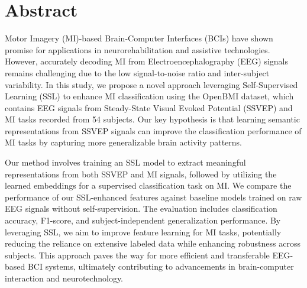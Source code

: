 \chapter*{Abstract}
\label{chap:abstract}


Motor Imagery (MI)-based Brain-Computer Interfaces (BCIs) have shown promise for applications in neurorehabilitation and assistive technologies. However, accurately decoding MI from Electroencephalography (EEG) signals remains challenging due to the low signal-to-noise ratio and inter-subject variability. In this study, we propose a novel approach leveraging Self-Supervised Learning (SSL) to enhance MI classification using the OpenBMI dataset, which contains EEG signals from Steady-State Visual Evoked Potential (SSVEP) and MI tasks recorded from 54 subjects. Our key hypothesis is that learning semantic representations from SSVEP signals can improve the classification performance of MI tasks by capturing more generalizable brain activity patterns.


Our method involves training an SSL model to extract meaningful representations from both SSVEP and MI signals, followed by utilizing the learned embeddings for a supervised classification task on MI. We compare the performance of our SSL-enhanced features against baseline models trained on raw EEG signals without self-supervision. The evaluation includes classification accuracy, F1-score, and subject-independent generalization performance. By leveraging SSL, we aim to improve feature learning for MI tasks, potentially reducing the reliance on extensive labeled data while enhancing robustness across subjects. This approach paves the way for more efficient and transferable EEG-based BCI systems, ultimately contributing to advancements in brain-computer interaction and neurotechnology.


